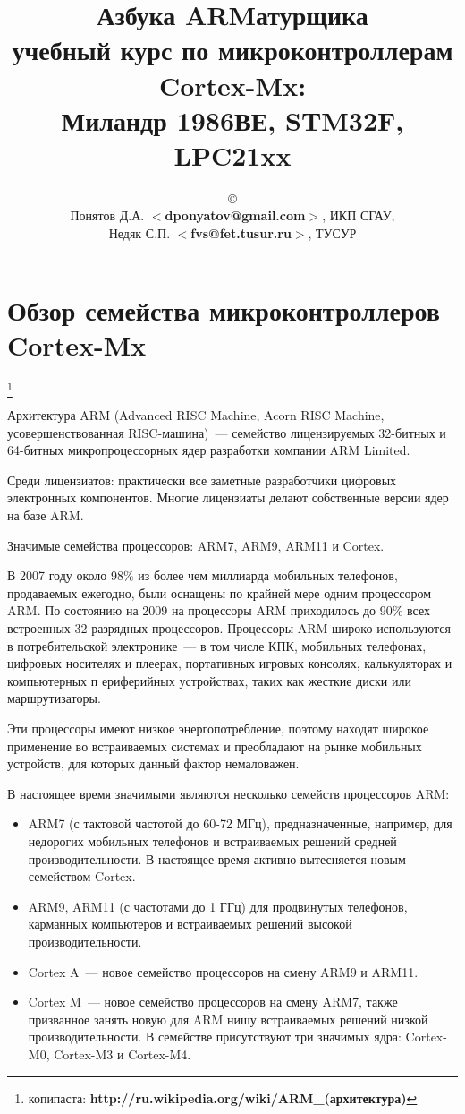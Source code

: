 \documentclass[oneside,12pt]{book}
\newcommand{\cm}[1]{Cortex-M#1}
\newcommand{\cx}{\cm{x}}
\renewcommand{\url}[1]{\textbf{#1}}
\newcommand{\email}[1]{$<$\textbf{#1}$>$}
\newcommand{\cp}[1]{\footnote{копипаста: #1}}
\begin{document}
\title{\Huge{Азбука ARMатурщика}\\
\normalsize{учебный курс по микроконтроллерам \cx:\\
Миландр 1986ВЕ, STM32F, LPC21xx}}
\author{\copyright\\
Понятов Д.А. \email{dponyatov@gmail.com}, ИКП СГАУ, \\
Недяк С.П. \email{fvs@fet.tusur.ru}, ТУСУР
}
\maketitle
\tableofcontents

\part{Обзор семейства микроконтроллеров \cx}

\cp{\url{http://ru.wikipedia.org/wiki/ARM\_(архитектура)}}

Архитектура ARM (Advanced RISC Machine, Acorn RISC Machine, 
усовершенствованная RISC-машина)\ --- семейство лицензируемых 32-битных и 
64-битных микропроцессорных ядер разработки компании ARM Limited.

Среди лицензиатов: практически все заметные разработчики цифровых
электронных компонентов.
Многие лицензиаты делают собственные версии ядер на базе ARM.

Значимые семейства процессоров: ARM7, ARM9, ARM11 и Cortex.

В 2007 году около 98\% из более чем миллиарда мобильных телефонов, продаваемых 
ежегодно, были оснащены по крайней мере одним процессором ARM. По состоянию 
на 2009 на процессоры ARM приходилось до 90\% всех встроенных 32-разрядных 
процессоров. Процессоры ARM широко используются в потребительской 
электронике\ --- в том числе КПК, мобильных телефонах, цифровых носителях и 
плеерах, портативных игровых консолях, калькуляторах и компьютерных п
ериферийных устройствах, таких как жесткие диски или маршрутизаторы.

Эти процессоры имеют низкое энергопотребление, поэтому находят широкое 
применение во встраиваемых системах и преобладают на рынке мобильных 
устройств, для которых данный фактор немаловажен.

В настоящее время значимыми являются несколько семейств процессоров ARM:

\begin{itemize}
\item ARM7 (с тактовой частотой до 60-72 МГц), предназначенные, например, для 
недорогих мобильных телефонов и встраиваемых решений средней производительности. 
В настоящее время активно вытесняется новым семейством Cortex.
\item ARM9, ARM11 (с частотами до 1 ГГц) для продвинутых телефонов, карманных 
компьютеров и встраиваемых решений высокой производительности.
\item Cortex A\ --- новое семейство процессоров на смену ARM9 и ARM11.
\item Cortex M\ --- новое семейство процессоров на смену ARM7, также 
призванное занять новую для ARM нишу встраиваемых решений низкой 
производительности. В семействе присутствуют три значимых ядра: \cm{0}, 
\cm{3} и \cm{4}.
\end{itemize}
\end{document}
